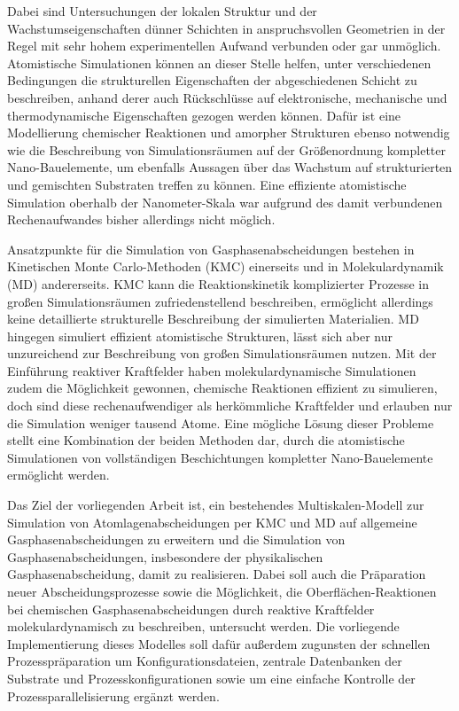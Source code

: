 Dabei sind Untersuchungen der lokalen Struktur und der Wachstumseigenschaften dünner Schichten in anspruchsvollen Geometrien in der Regel mit sehr hohem experimentellen Aufwand verbunden oder gar unmöglich.
Atomistische Simulationen können an dieser Stelle helfen, unter verschiedenen Bedingungen die strukturellen Eigenschaften der abgeschiedenen Schicht zu beschreiben, anhand derer auch Rückschlüsse auf elektronische, mechanische und thermodynamische Eigenschaften gezogen werden können.
Dafür ist eine Modellierung chemischer Reaktionen und amorpher Strukturen ebenso notwendig wie die Beschreibung von Simulationsräumen auf der Größenordnung kompletter Nano-Bauelemente, um ebenfalls Aussagen über das Wachstum auf strukturierten und gemischten Substraten treffen zu können.
Eine effiziente atomistische Simulation oberhalb der Nanometer-Skala war aufgrund des damit verbundenen Rechenaufwandes bisher allerdings nicht möglich.


Ansatzpunkte für die Simulation von Gasphasenabscheidungen bestehen in Kinetischen Monte Carlo-Methoden (KMC) einerseits und in Molekulardynamik (MD) andererseits.
KMC kann die Reaktionskinetik komplizierter Prozesse in großen Simulationsräumen zufriedenstellend beschreiben, ermöglicht allerdings keine detaillierte strukturelle Beschreibung der simulierten Materialien.
MD hingegen simuliert effizient atomistische Strukturen, lässt sich aber nur unzureichend zur Beschreibung von großen Simulationsräumen nutzen.
Mit der Einführung reaktiver Kraftfelder haben molekulardynamische Simulationen zudem die Möglichkeit gewonnen, chemische Reaktionen effizient zu simulieren, doch sind diese rechenaufwendiger als herkömmliche Kraftfelder und erlauben nur die Simulation weniger tausend Atome.
Eine mögliche Lösung dieser Probleme stellt eine Kombination der beiden Methoden dar, durch die atomistische Simulationen von vollständigen Beschichtungen kompletter Nano-Bauelemente ermöglicht werden.


Das Ziel der vorliegenden Arbeit ist, ein bestehendes Multiskalen-Modell zur Simulation von Atomlagenabscheidungen per KMC und MD auf allgemeine Gasphasenabscheidungen zu erweitern und die Simulation von Gasphasenabscheidungen, insbesondere der physikalischen Gasphasenabscheidung, damit zu realisieren.
Dabei soll auch die Präparation neuer Abscheidungsprozesse sowie die Möglichkeit, die Oberflächen-Reaktionen bei chemischen Gasphasenabscheidungen durch reaktive Kraftfelder molekulardynamisch zu beschreiben, untersucht werden.
Die vorliegende Implementierung dieses Modelles soll dafür außerdem zugunsten der schnellen Prozesspräparation um Konfigurationsdateien, zentrale Datenbanken der Substrate und Prozesskonfigurationen sowie um eine einfache Kontrolle der Prozessparallelisierung ergänzt werden.

